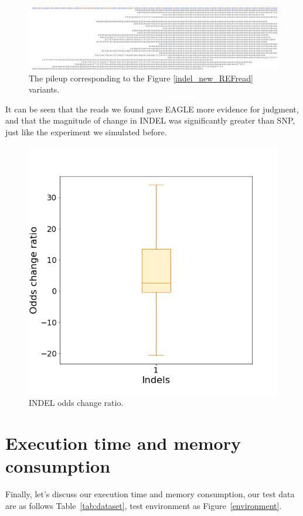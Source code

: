 \begin{figure}[H]
\centering
\includegraphics[width=1\columnwidth]{body/image/indel_pileup_REFread.png}
\caption[Figure 4.24 pileup]{The pileup corresponding to the Figure \ref{indel_new_REFread} variants.}
\label{indel_pileup_REFread}
\end{figure}

It can be seen that the reads we found gave EAGLE more evidence for judgment, and that the magnitude of change in INDEL was significantly greater than SNP, just like the experiment we simulated before.

\begin{figure}[H]
\centering
\includegraphics[width=0.6\columnwidth]{body/image/indel_odds_change.png}
\caption[INDEL odds change ratio]{INDEL odds change ratio.}
\label{indel_odds_change}
\end{figure}

\section{Execution time and memory consumption}

Finally, let’s discuss our execution time and memory consumption, our test data are as follows Table~\ref{tab:dataset}, test environment as Figure~\ref{environment}.

